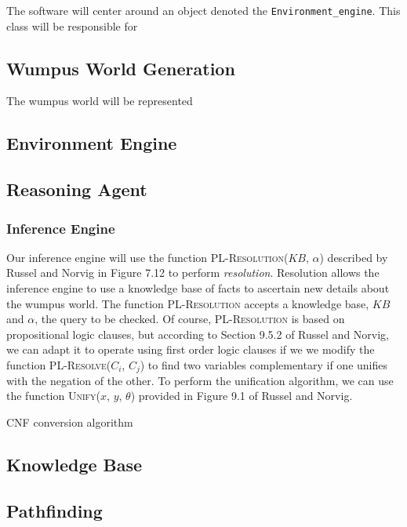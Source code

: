 \documentclass{article}
\begin{document}
		The software will center around an object denoted the \texttt{Environment\_engine}. This class will be responsible for 
		
		\subsection{Wumpus World Generation}
		
			The wumpus world will be represented 
		
		\subsection{Environment Engine}
		
		\subsection{Reasoning Agent}
		
			\subsubsection{Inference Engine}
			
				Our inference engine will use the function \textsc{PL-Resolution}($KB$, $\alpha$) described by Russel and Norvig in Figure 7.12 \cite{ai} to perform \textit{resolution}. Resolution allows the inference engine to use a knowledge base of facts to ascertain new details about the wumpus world. The function \textsc{PL-Resolution} accepts a knowledge base, $KB$ and $\alpha$, the query to be checked. Of course, \textsc{PL-Resolution} is based on propositional logic clauses, but according to Section 9.5.2 of Russel and Norvig, we can adapt it to operate using first order logic clauses if we we modify the function \textsc{PL-Resolve($C_i$, $C_j$)} to find two variables complementary if one unifies with the negation of the other. To perform the unification algorithm, we can use the function \textsc{Unify}($x$, $y$, $\theta$) provided in Figure 9.1 of Russel and Norvig.
				
				CNF conversion algorithm
			
			\subsection{Knowledge Base}
			
			\subsection{Pathfinding}
			
\end{document}
